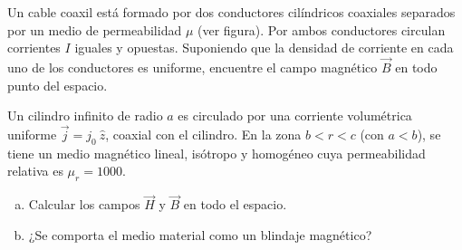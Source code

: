 \documentclass[problemas]{guia}
\begin{document}
\begin{problema}{}
    Un cable coaxil está formado por dos conductores cilíndricos coaxiales 
    separados por un medio de permeabilidad $\mu$ (ver figura). Por ambos 
    conductores circulan corrientes $I$ iguales y opuestas. Suponiendo que la 
    densidad  de corriente en  cada uno  de los  conductores  es  uniforme,
    encuentre el campo magnético $\vec{B}$ en todo punto del espacio.
\end{problema}

\begin{problema}{}
    Un cilindro infinito de radio $a$ es circulado por una corriente 
    volumétrica uniforme  $\vec{j} = j_0 \: \hat{z}$, coaxial con el cilindro.
    En la zona $b < r < c$ (con $a < b$), se tiene un medio magnético lineal,
    isótropo y homogéneo cuya permeabilidad relativa es $\mu_r =1000$.
    \begin{enumerate}[(a)]
        \item Calcular los campos $\vec{H}$ y $\vec{B}$ en todo el espacio.
        \item ¿Se comporta el medio material como un blindaje magnético?
    \end{enumerate}
\end{problema}
\end{document}
